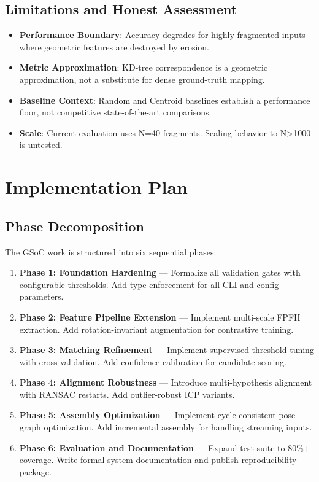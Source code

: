 \documentclass[11pt,a4paper]{article}
\begin{document}
\subsection{Limitations and Honest Assessment}

\begin{itemize}[leftmargin=*]
    \item \textbf{Performance Boundary}: Accuracy degrades for highly fragmented inputs where geometric features are destroyed by erosion.
    \item \textbf{Metric Approximation}: KD-tree correspondence is a geometric approximation, not a substitute for dense ground-truth mapping.
    \item \textbf{Baseline Context}: Random and Centroid baselines establish a performance floor, not competitive state-of-the-art comparisons.
    \item \textbf{Scale}: Current evaluation uses N=40 fragments. Scaling behavior to N>1000 is untested.
\end{itemize}

\section{Implementation Plan}

\subsection{Phase Decomposition}

The GSoC work is structured into six sequential phases:

\begin{enumerate}[leftmargin=*]
    \item \textbf{Phase 1: Foundation Hardening} — Formalize all validation gates with configurable thresholds. Add type enforcement for all CLI and config parameters.
    \item \textbf{Phase 2: Feature Pipeline Extension} — Implement multi-scale FPFH extraction. Add rotation-invariant augmentation for contrastive training.
    \item \textbf{Phase 3: Matching Refinement} — Implement supervised threshold tuning with cross-validation. Add confidence calibration for candidate scoring.
    \item \textbf{Phase 4: Alignment Robustness} — Introduce multi-hypothesis alignment with RANSAC restarts. Add outlier-robust ICP variants.
    \item \textbf{Phase 5: Assembly Optimization} — Implement cycle-consistent pose graph optimization. Add incremental assembly for handling streaming inputs.
    \item \textbf{Phase 6: Evaluation and Documentation} — Expand test suite to 80\%+ coverage. Write formal system documentation and publish reproducibility package.
\end{enumerate}
\end{document}
